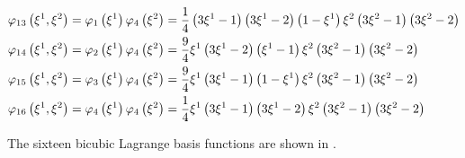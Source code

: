 \begin{equation}
\begin{split}
    \lbfn{13}{\xione,\xitwo}&=\lbfn{1}{\xione}\lbfn{4}{\xitwo}=
    \frac14\pbrac{3\xione-1}\pbrac{3\xione-2}\pbrac{1-\xione}\xitwo\pbrac{3\xitwo-1}\pbrac{3\xitwo-2}\\
    \lbfn{14}{\xione,\xitwo}&=\lbfn{2}{\xione}\lbfn{4}{\xitwo}=
    \frac94\xione\pbrac{3\xione-2}\pbrac{\xione-1}\xitwo\pbrac{3\xitwo-1}\pbrac{3\xitwo-2} \\
    \lbfn{15}{\xione,\xitwo}&=\lbfn{3}{\xione}\lbfn{4}{\xitwo}=
    \frac94\xione\pbrac{3\xione-1}\pbrac{1-\xione}\xitwo\pbrac{3\xitwo-1}\pbrac{3\xitwo-2} \\
    \lbfn{16}{\xione,\xitwo}&=\lbfn{4}{\xione}\lbfn{4}{\xitwo}=
    \frac14\xione\pbrac{3\xione-1}\pbrac{3\xione-2}\xitwo\pbrac{3\xitwo-1}\pbrac{3\xitwo-2}
  \end{split}
\end{equation}

The sixteen \twodal bicubic Lagrange basis functions are shown in .

            
